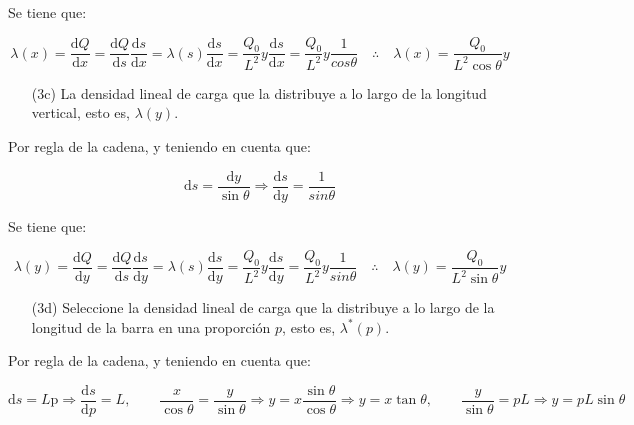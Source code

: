 \documentclass[a4paper,10pt]{article}
\begin{document}
Se tiene que:

\begin{equation*}
    \lambda(x)=\frac{\mathrm{d}Q}{\mathrm{d}x}=\frac{\mathrm{d}Q}{\mathrm{d}s}\frac{\mathrm{d}s}{\mathrm{d}x}
    =\lambda(s)\frac{\mathrm{d}s}{\mathrm{d}x}
    =\frac{Q_{0}}{L^{2}}y\frac{\mathrm{d}s}{\mathrm{d}x}
    =\frac{Q_{0}}{L^{2}}y\frac{1}{cos\theta}
    \quad\therefore\quad\boxed{\lambda(x)=\frac{Q_{0}}{L^{2}\cos\theta}y}
\end{equation*}

\begin{itemize}
    \item[(3c)] La densidad lineal de carga que la distribuye a lo largo de la longitud vertical, esto es, $\lambda(y)$.
\end{itemize}

Por regla de la cadena, y teniendo en cuenta que:

\begin{equation*}
    \mathrm{d}s=\frac{\mathrm{d}y}{\sin\theta}
    \Longrightarrow\frac{\mathrm{d}s}{\mathrm{d}y}=\frac{1}{sin\theta}
\end{equation*}

Se tiene que:

\begin{equation*}
    \lambda(y)=\frac{\mathrm{d}Q}{\mathrm{d}y}=\frac{\mathrm{d}Q}{\mathrm{d}s}\frac{\mathrm{d}s}{\mathrm{d}y}
    =\lambda(s)\frac{\mathrm{d}s}{\mathrm{d}y}
    =\frac{Q_{0}}{L^{2}}y\frac{\mathrm{d}s}{\mathrm{d}y}
    =\frac{Q_{0}}{L^{2}}y\frac{1}{sin\theta}
    \quad\therefore\quad\boxed{\lambda(y)=\frac{Q_{0}}{L^{2}\sin\theta}y}
\end{equation*}

\begin{itemize}
    \item[(3d)] Seleccione la densidad lineal de carga que la distribuye a lo largo de la longitud de la barra en
    una proporción $p$, esto es, $\lambda^{*}(p)$.
\end{itemize}

Por regla de la cadena, y teniendo en cuenta que:

\begin{equation*}
    \mathrm{d}s=L\mathrm{p}
    \Longrightarrow\frac{\mathrm{d}s}{\mathrm{d}p}=L,\qquad
    \frac{x}{\cos\theta}=\frac{y}{\sin\theta}
    \Longrightarrow y=x\frac{\sin\theta}{\cos\theta}\Longrightarrow y=x\tan\theta,\qquad
    \frac{y}{\sin\theta}=pL\Longrightarrow y=pL\sin\theta
\end{equation*}
\end{document}
